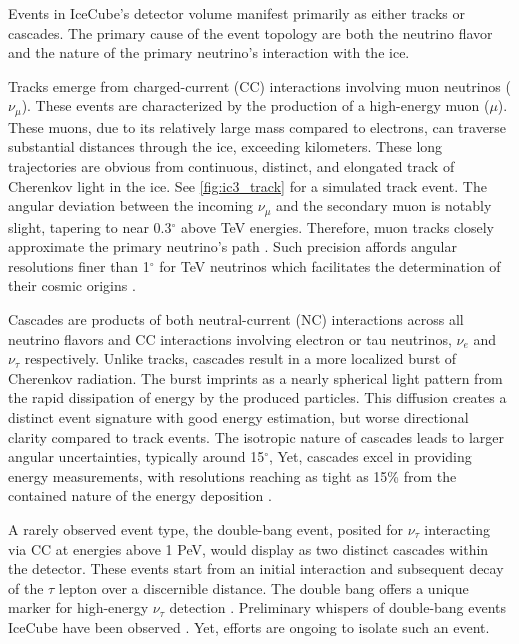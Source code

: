 Events in IceCube's detector volume manifest primarily as either tracks or cascades.
The primary cause of the event topology are both the neutrino flavor and the nature of the primary neutrino's interaction with the ice.

Tracks emerge from charged-current (CC) interactions involving muon neutrinos ($\nu_\mu$).
These events are characterized by the production of a high-energy muon ($\mu$).
These muons, due to its relatively large mass compared to electrons, can traverse substantial distances through the ice, exceeding kilometers.
These long trajectories are obvious from continuous, distinct, and elongated track of Cherenkov light in the ice.
See \cref{fig:ic3_track} for a simulated track event.
The angular deviation between the incoming $\nu_\mu$ and the secondary muon is notably slight, tapering to near 0.3$^\circ$ above TeV energies.
Therefore, muon tracks closely approximate the primary neutrino's path \cite{physics_withIC3,IC3_energyReco}.
Such precision affords angular resolutions finer than 1$^\circ$ for TeV neutrinos which facilitates the determination of their cosmic origins \cite{physics_withIC3}.

Cascades are products of both neutral-current (NC) interactions across all neutrino flavors and CC interactions involving electron or tau neutrinos, $\nu_e$ and $\nu_\tau$ respectively.
Unlike tracks, cascades result in a more localized burst of Cherenkov radiation.
The burst imprints as a nearly spherical light pattern from the rapid dissipation of energy by the produced particles.
This diffusion creates a distinct event signature with good energy estimation, but worse directional clarity compared to track events.
The isotropic nature of cascades leads to larger angular uncertainties, typically around 15$^\circ$,
Yet, cascades excel in providing energy measurements, with resolutions reaching as tight as 15\% from the contained nature of the energy deposition \cite{physics_withIC3,IC3_energyReco}.

A rarely observed event type, the double-bang event, posited for $\nu_\tau$ interacting via CC at energies above 1 PeV, would display as two distinct cascades within the detector.
These events start from an initial interaction and subsequent decay of the $\tau$ lepton over a discernible distance.
The double bang offers a unique marker for high-energy $\nu_\tau$ detection \cite{physics_withIC3}.
Preliminary whispers of double-bang events IceCube have been observed \cite{IC3_taus}.
Yet, efforts are ongoing to isolate such an event.

